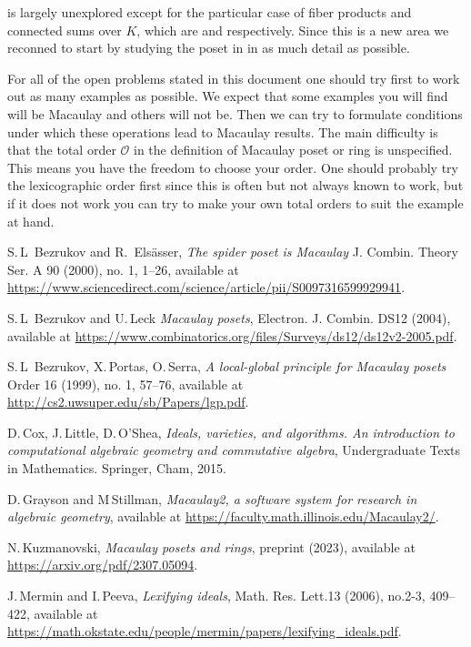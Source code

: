 \documentclass[11pt]{amsart}
\renewcommand{\O}{{\mathcal O}}
\theoremstyle{plain} %
\theoremstyle{definition}
\theoremstyle{remark}
\numberwithin{equation}{section}  %
\begin{document}
 is largely unexplored except for the particular case of fiber products and connected sums over $K$, which are  and  respectively. Since this is a new area we reconned to start by studying the poset in  in as much detail as possible.

For all of the open problems  stated in this document one should try first to work out as many examples as possible. We expect that some examples you will find will be Macaulay and others will not be. Then we can try to formulate conditions  under which these operations lead to Macaulay results. The main difficulty is that the total order $\O$ in the definition of Macaulay poset or ring is unspecified. This means you have the freedom to choose your order. One should probably try the lexicographic order first since this is often but not always known to work, but if it does not work you can try to make your own total orders to suit the example at hand. 
 

\vspace{1em}

\begin{thebibliography}{99}

 S.\,L\, Bezrukov and R.\, Els\"{a}sser, {\em The spider poset is Macaulay}
J. Combin. Theory Ser. A 90 (2000), no. 1, 1--26, available at \url{https://www.sciencedirect.com/science/article/pii/S0097316599929941}.

 S.\,L\, Bezrukov and U.\,Leck {\em Macaulay posets}, Electron. J. Combin. DS12 (2004), available at \url{https://www.combinatorics.org/files/Surveys/ds12/ds12v2-2005.pdf}.

 S.\,L\, Bezrukov, X.\,Portas, O.\,Serra, {\em A local-global principle for Macaulay posets} Order 16 (1999), no. 1, 57--76, available at  \url{http://cs2.uwsuper.edu/sb/Papers/lgp.pdf}.

D.\,Cox, J.\,Little, D.\,O'Shea, 
{\em Ideals, varieties, and algorithms. An introduction to computational algebraic geometry and commutative algebra}, Undergraduate Texts in Mathematics. Springer, Cham, 2015.

D.\,Grayson and M\,Stillman,  {\em Macaulay2, a software system for research in algebraic geometry},
 available at \url{https://faculty.math.illinois.edu/Macaulay2/}.
 
N.\,Kuzmanovski,
{\em Macaulay posets and rings}, preprint (2023), available at \url{https://arxiv.org/pdf/2307.05094}.


 
 J.\,Mermin and I.\,Peeva, {\em Lexifying ideals}, Math. Res. Lett.13 (2006), no.2-3, 409--422, available at \url{https://math.okstate.edu/people/mermin/papers/lexifying_ideals.pdf}.



\end{thebibliography}
\end{document}
